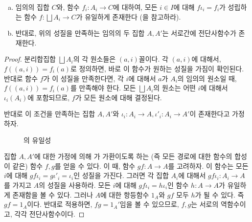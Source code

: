 \begin{theorem}
\label{thm:coproductset}
\begin{enumerate}[(a)]
    \item 임의의 집합 $C$와, 함수 $f_i: A_i \to C$에 대하여, 모든 $i \in I$에 대해 $f\iota_i = f_i$가 성립하는 함수 $f: \bigsqcup A_i \to C$가 유일하게 존재한다 (을 참고하라).
    \item 반대로, 위의 성질을 만족하는 임의의 두 집합 $A, A'$는 서로간에 전단사함수가 존재한다.
\end{enumerate}
\end{theorem}
\begin{proof}
    분리합집합 $\bigsqcup A_i$의 각 원소들은 $(a, i)$꼴이다.
    각 $(a, i)$에 대해서, $f((a, i)) = f_i(a)$로 정의하면, 바로 이 함수가 원하는 성질을 가짐이 확인된다.
    반대로 함수 $f$가 이 성질을 만족한다면, 각 $i$에 대해서 $a$가 $A_i$의 임의의 원소일 때, $f((a, i)) = f_i(a)$를 만족해야 한다.
    모든 $\bigsqcup A_i$의 원소는 어떤 $i$에 대해서 $\iota_i(A_i)$에 포함되므로, $f$가 모든 원소에 대해 결정된다.

    반대로 이 조건을 만족하는 집합 $A, A'$와 $\iota_i: A_i \to A, \iota'_i : A_i \to A'$이 존재한다고 가정하자.
\begin{figure}[ht]
\centering
{}
    \caption{의 유일성}
    \label{fig:coproductsetunique}
\end{figure}
    
    집합 $A, A'$에 대한 가정에 의해 가 가환이도록 하는 (즉 모든 경로에 대한 함수의 합성이 같은) 함수 $f, g$를 얻을 수 있다.
    이 때, 함수 $gf: A \to A$를 고려하자.
    이 함수는 모든 $i$에 대해 $gf\iota_i = g\iota'_i = \iota_i$인 성질을 가진다.
    그러면 각 집합 $A_i$에 대해서 $gf\iota_i: A_i \to A$를 가지고 $A$의 성질을 사용하라.
    모든 $i$에 대해 $gf\iota_i = h\iota_i$인 함수 $h: A \to A$가 유일하게 존재함을 볼 수 있다.
    그러나 $A$에 대한 항등함수 $1_A$와 $gf$ 모두 $h$가 될 수 있다.
    즉 $gf = 1_A$이다.
    반대로 적용하면, $fg = 1_A'$임을 볼 수 있으므로, $f, g$는 서로의 역함수이고, 각각 전단사함수이다.
\end{proof}

